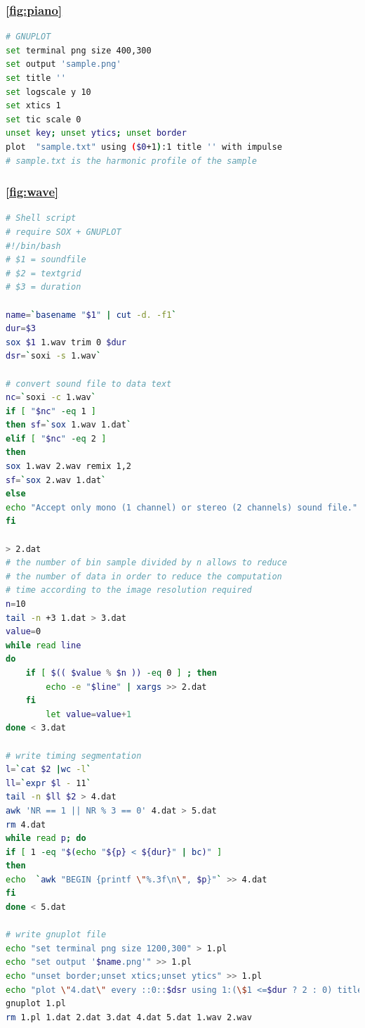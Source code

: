 \documentclass{book}
\begin{document}
\subsubsection{\ref{fig:piano}}
\label{an:pia}
\begin{lstlisting}[language=bash]
# GNUPLOT
set terminal png size 400,300 
set output 'sample.png' 
set title ''
set logscale y 10
set xtics 1
set tic scale 0
unset key; unset ytics; unset border 
plot  "sample.txt" using ($0+1):1 title '' with impulse
# sample.txt is the harmonic profile of the sample
\end{lstlisting}

\subsubsection{\ref{fig:wave}}
\label{an:wav}
\begin{lstlisting}[language=bash]
# Shell script
# require SOX + GNUPLOT
#!/bin/bash
# $1 = soundfile
# $2 = textgrid
# $3 = duration

name=`basename "$1" | cut -d. -f1`
dur=$3
sox $1 1.wav trim 0 $dur
dsr=`soxi -s 1.wav`

# convert sound file to data text
nc=`soxi -c 1.wav`
if [ "$nc" -eq 1 ]
then sf=`sox 1.wav 1.dat`
elif [ "$nc" -eq 2 ]
then 
sox 1.wav 2.wav remix 1,2
sf=`sox 2.wav 1.dat`
else
echo "Accept only mono (1 channel) or stereo (2 channels) sound file."
fi

> 2.dat
# the number of bin sample divided by n allows to reduce 
# the number of data in order to reduce the computation 
# time according to the image resolution required
n=10 
tail -n +3 1.dat > 3.dat
value=0
while read line
do
    if [ $(( $value % $n )) -eq 0 ] ; then
        echo -e "$line" | xargs >> 2.dat
    fi
        let value=value+1 
done < 3.dat

# write timing segmentation 
l=`cat $2 |wc -l`
ll=`expr $l - 11`
tail -n $ll $2 > 4.dat
awk 'NR == 1 || NR % 3 == 0' 4.dat > 5.dat
rm 4.dat
while read p; do
if [ 1 -eq "$(echo "${p} < ${dur}" | bc)" ]
then
echo  `awk "BEGIN {printf \"%.3f\n\", $p}"` >> 4.dat
fi
done < 5.dat	

# write gnuplot file
echo "set terminal png size 1200,300" > 1.pl
echo "set output '$name.png'" >> 1.pl
echo "unset border;unset xtics;unset ytics" >> 1.pl
echo "plot \"4.dat\" every ::0::$dsr using 1:(\$1 <=$dur ? 2 : 0) title '' with impulses lc rgb '#A9A9A9', \"2.dat\" every ::0::$dsr using 1:(\$2+1) with lines lc rgb '#696969' title \"\"" >> 1.pl
gnuplot 1.pl
rm 1.pl 1.dat 2.dat 3.dat 4.dat 5.dat 1.wav 2.wav	
\end{lstlisting}
\end{document}
